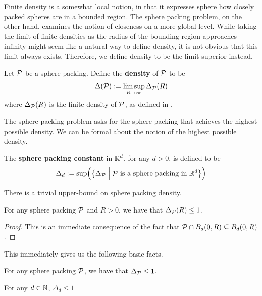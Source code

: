 Finite density is a somewhat local notion, in that it expresses sphere how closely packed spheres are in a bounded region. The sphere packing problem, on the other hand, examines the notion of closeness on a more global level. While taking the limit of finite densities as the radius of the bounding region approaches infinity might seem like a natural way to define density, it is not obvious that this limit always exists. Therefore, we define density to be the limit superior instead.

\begin{boxdefinition}[Density]\label{Ch2:Def:Density}
    Let $\mathcal{P}$ be a sphere packing. Define the \textbf{density} of $\mathcal{P}$ to be
    \begin{align*}
        \Delta(\mathcal{P}) := \limsup_{R \to \infty} \Delta_{\mathcal{P}}(R)
    \end{align*}
    where $\Delta_{\mathcal{P}}(R)$ is the finite density of $\mathcal{P}$, as defined in .
\end{boxdefinition}

The sphere packing problem asks for the sphere packing that achieves the highest possible density. We can be formal about the notion of the highest possible density.

\begin{boxdefinition}
    The \textbf{sphere packing constant} in $\mathbb{R}^d$, for any $d > 0$, is defined to be
    \begin{align*}
        \Delta_d := \sup\!\left( {\left\{ \Delta_{\mathcal{P}} \; \middle\vert \; \mathcal{P} \text{ is a sphere packing in } \mathbb{R}^d \right\}} \right)
    \end{align*}
\end{boxdefinition}

There is a trivial upper-bound on sphere packing density.

\begin{boxlemma}
    For any sphere packing $\mathcal{P}$ and $R > 0$, we have that $\Delta_{\mathcal{P}}(R) \leq 1$.
\end{boxlemma}
\begin{proof}
    This is an immediate consequence of the fact that $\mathcal{P} \cap B_d(0, R) \subseteq B_d(0, R)$.
\end{proof}
This immediately gives us the following basic facts.
\begin{boxcorollary}
    For any sphere packing $\mathcal{P}$, we have that $\Delta_{\mathcal{P}} \leq 1$.
\end{boxcorollary}
\begin{boxcorollary}
    For any $d \in \mathbb{N}$, $\Delta_d \leq 1$
\end{boxcorollary}


